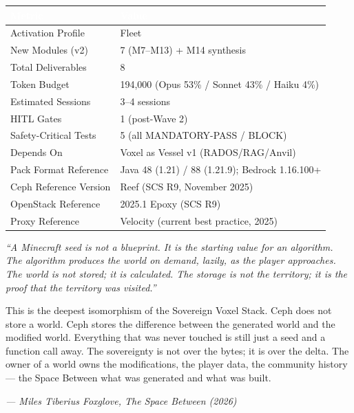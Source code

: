 \documentclass[11pt,letterpaper]{article}
\newcommand{\tableheader}[1]{\textbf{\sffamily\textcolor{white}{#1}}}
\begin{document}
\begin{center}
\begin{tabularx}{\textwidth}{L{5cm}X}
\toprule
{}
\tableheader{Metric} & \tableheader{Value} \\
\midrule
Activation Profile & Fleet \\
New Modules (v2) & 7 (M7--M13) + M14 synthesis \\
Total Deliverables & 8 \\
Token Budget & 194,000 (Opus 53\% / Sonnet 43\% / Haiku 4\%) \\
Estimated Sessions & 3--4 sessions \\
HITL Gates & 1 (post-Wave 2) \\
Safety-Critical Tests & 5 (all MANDATORY-PASS / BLOCK) \\
Depends On & Voxel as Vessel v1 (RADOS/RAG/Anvil) \\
Pack Format Reference & Java 48 (1.21) / 88 (1.21.9); Bedrock 1.16.100+ \\
Ceph Reference Version & Reef (SCS R9, November 2025) \\
OpenStack Reference & 2025.1 Epoxy (SCS R9) \\
Proxy Reference & Velocity (current best practice, 2025) \\
\bottomrule
\end{tabularx}
\end{center}

\vspace{2em}

\begin{quotebox}
\textit{``A Minecraft seed is not a blueprint. It is the starting value for an algorithm. The algorithm produces the world on demand, lazily, as the player approaches. The world is not stored; it is calculated. The storage is not the territory; it is the proof that the territory was visited.''}

\vspace{0.8em}

This is the deepest isomorphism of the Sovereign Voxel Stack. Ceph does not store a world. Ceph stores the difference between the generated world and the modified world. Everything that was never touched is still just a seed and a function call away. The sovereignty is not over the bytes; it is over the delta. The owner of a world owns the modifications, the player data, the community history --- the Space Between what was generated and what was built.

\vspace{0.4em}
\textit{--- Miles Tiberius Foxglove, The Space Between (2026)}
\end{quotebox}
\end{document}
